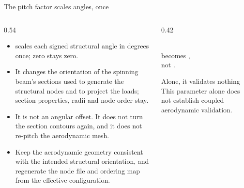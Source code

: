 \begin{frame}{The pitch factor scales angles, once}
\begin{columns}[T]
\begin{column}{0.54\textwidth}
\begin{itemize}\small
  \item {} scales each signed
        structural angle in degrees once; zero stays zero.
  \item It changes the orientation of the spinning beam's sections used to
        generate the structural nodes and to project the loads; section
        properties, radii and node order stay.
  \item It is not an angular offset. It does not turn the section contours
        again, and it does not re-pitch the aerodynamic mesh.
  \item Keep the aerodynamic geometry consistent with the intended structural
        orientation, and regenerate the node file and ordering map from the
        effective configuration.
\end{itemize}
\end{column}
\begin{column}{0.42\textwidth}
\begin{ftsevidence}
\small {}\\[1mm]
becomes \code{[-90, 30]},\\
not \code{[-180, 60]}.
\end{ftsevidence}
\begin{alertblock}{Alone, it validates nothing}
\small This parameter alone does not establish coupled aerodynamic
validation.
\end{alertblock}
\end{column}
\end{columns}
\end{frame}

